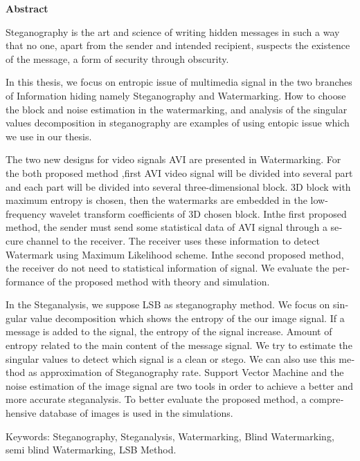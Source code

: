 \thispagestyle{empty} %
\begin{latin} %

\centerline{\textbf{\large{Abstract}}}
\vskip 1cm

Steganography is the art and science of writing hidden messages in such a way that no one, apart from the sender and intended recipient, suspects the existence of the message, a form of security through obscurity.

In this thesis, we focus on  entropic issue of multimedia signal in the two branches of Information hiding namely Steganography and  Watermarking. How to choose the block and noise estimation in the watermarking, and analysis of the singular values decomposition in steganography are examples of using entopic issue which we use in our thesis. 

The two new designs for video signals AVI are presented in Watermarking. For the both proposed method ,first AVI video signal will be divided into several part and each part  will be divided into several three-dimensional block. 3D block with maximum entropy is chosen, then the watermarks are embedded in the low-frequency wavelet transform coefficients of 3D chosen block. Inthe first proposed method, the sender must send some statistical data of AVI signal through a secure channel to the receiver. The receiver uses these information to detect Watermark using Maximum Likelihood scheme. Inthe second proposed method, the receiver do not need to statistical information of signal. We evaluate  the performance of the proposed method with theory and simulation.

In the Steganalysis, we suppose  LSB as steganography method. We focus on singular value decomposition which shows the entropy of the our image signal. If a message is added to the signal, the entropy of the signal increase. Amount of entropy related to the main content of the message signal. We try to estimate the singular values ​​to detect which signal is a  clean or stego. We can also use this method as approximation of  Steganography rate. Support Vector Machine and the noise estimation of the image signal are two tools in order to achieve a better and more accurate steganalysis. To better evaluate the proposed method, a comprehensive database of images is used in the simulations.

Keywords: Steganography, Steganalysis, Watermarking, Blind Watermarking, semi blind Watermarking, LSB Method.

\end{latin}
